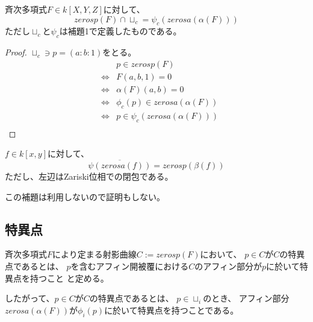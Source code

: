 \documentclass[a4paper]{jsarticle}
\begin{document}
    \begin{Prop}
        斉次多項式$F \in k[X, Y, Z]$に対して、
        \[ zerosp(F) \cap \sqcup_c = \psi_c(zerosa(\alpha(F)))\]
        ただし$\sqcup_c$と$\psi_c$は補題1で定義したものである。
    \end{Prop}
    \begin{proof}
        $\sqcup_c \ni p=(a : b : 1)$をとる。
        \begin{eqnarray*}
            &{}&    p \in zerosp(F) \\
            &\iff&  F(a,b,1)=0 \\
            &\iff&  \alpha(F)(a,b)=0 \\
            &\iff&  \phi_c(p) \in zerosa(\alpha(F)) \\
            &\iff&  p \in \psi_c(zerosa(\alpha(F))) \\
        \end{eqnarray*}
        
    \end{proof}

    \begin{Lemma}
        $f \in k[x, y]$に対して、
        \[ \overline{\psi(zerosa(f))}=zerosp(\beta(f)) \]
        ただし、左辺はZariski位相での閉包である。
    \end{Lemma}
    この補題は利用しないので証明もしない。

\subsection{特異点}
    \begin{Def}[射影曲線の特異点]
        斉次多項式$F$により定まる射影曲線$C:=zerosp(F)$において、
        $p \in C$が$C$の特異点であるとは、
        $p$を含むアフィン開被覆における$C$のアフィン部分が$p$に於いて特異点を持つこと
        と定める。

        したがって、$p \in C$が$C$の特異点であるとは、
        $p \in \sqcup_i$のとき、
        アフィン部分$zerosa(\alpha(F))$が$\phi_i(p)$に於いて特異点を持つことである。
    \end{Def}
\end{document}
